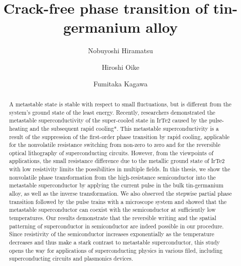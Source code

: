 \documentclass[aip,apl,reprint]{revtex4-1}
\begin{document}

\title{Crack-free phase transition of tin-germanium alloy} 
\author{Nobuyoshi Hiramatsu}
\author{Hiroshi Oike}
\author{Fumitaka Kagawa}

\begin{abstract}
A metastable state is stable with respect to small fluctuations, but is different from the system's ground state of the least energy. Recently, researchers demonstrated the metastable superconductivity of the super-cooled state in IrTe2 caused by the pulse-heating and the subsequent rapid cooling*. This metastable superconductivity is a result of the suppression of the first-order phase transition by rapid cooling, applicable for the nonvolatile resistance switching from non-zero to zero and for the reversible optical lithography of superconducting circuits. However, from the viewpoints of applications, the small resistance difference due to the metallic ground state of IrTe2 with low resistivity limits the possibilities in multiple fields. In this thesis, we show the nonvolatile phase transformation from the high-resistance semiconductor into the metastable superconductor by applying the current pulse in the bulk tin-germanium alloy, as well as the inverse transformation. We also observed the stepwise partial phase transition followed by the pulse trains with a microscope system and showed that the metastable superconductor can coexist with the semiconductor at sufficiently low temperatures. Our results demonstrate that the reversible writing and the spatial patterning of superconductor in semiconductor are indeed possible in our procedure. Since resistivity of the semiconductor increases exponentially as the temperature decreases and thus make a stark contrast to metastable superconductor, this study opens the way for applications of superconducting physics in various filed, including superconducting circuits and plasmonics devices.
\end{abstract}

\maketitle 
\end{document}
